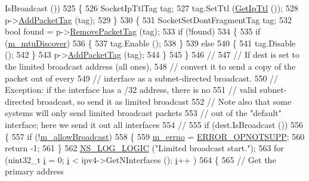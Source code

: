 \begin{DoxyCode}
      IsBroadcast ())
525     \{
526       SocketIpTtlTag tag;
527       tag.SetTtl (\hyperlink{classns3_1_1Socket_adf6420d12b8a0b6a20e46c37fe48830d}{GetIpTtl} ());
528       p->\hyperlink{classns3_1_1Packet_a7400b8655852f5271c5957250d0141af}{AddPacketTag} (tag);
529     \}
530   \{
531     SocketSetDontFragmentTag tag;
532     \textcolor{keywordtype}{bool} found = p->\hyperlink{classns3_1_1Packet_a078fe922d976a417ab25ba2f3c2fd667}{RemovePacketTag} (tag);
533     \textcolor{keywordflow}{if} (!found)
534       \{
535         \textcolor{keywordflow}{if} (\hyperlink{classns3_1_1UdpSocketImpl_ab5ae932e01b5746539b9ad20b3ff4f46}{m\_mtuDiscover})
536           \{
537             tag.Enable ();
538           \}
539         \textcolor{keywordflow}{else}
540           \{
541             tag.Disable ();
542           \}
543         p->\hyperlink{classns3_1_1Packet_a7400b8655852f5271c5957250d0141af}{AddPacketTag} (tag);
544       \}
545   \}
546   \textcolor{comment}{//}
547   \textcolor{comment}{// If dest is set to the limited broadcast address (all ones),}
548   \textcolor{comment}{// convert it to send a copy of the packet out of every }
549   \textcolor{comment}{// interface as a subnet-directed broadcast.}
550   \textcolor{comment}{// Exception:  if the interface has a /32 address, there is no}
551   \textcolor{comment}{// valid subnet-directed broadcast, so send it as limited broadcast}
552   \textcolor{comment}{// Note also that some systems will only send limited broadcast packets}
553   \textcolor{comment}{// out of the "default" interface; here we send it out all interfaces}
554   \textcolor{comment}{//}
555   \textcolor{keywordflow}{if} (dest.IsBroadcast ())
556     \{
557       \textcolor{keywordflow}{if} (!\hyperlink{classns3_1_1UdpSocketImpl_a071404252802565f1d1511b5c98b155a}{m\_allowBroadcast})
558         \{
559           \hyperlink{classns3_1_1UdpSocketImpl_ac35998e8aa2cc588e21752944b0a0095}{m\_errno} = \hyperlink{classns3_1_1Socket_ada1328c5ae0c28cb2a982caf8f6d6ccaa777b6c9712ef5485ebecfb96d5de4d54}{ERROR\_OPNOTSUPP};
560           \textcolor{keywordflow}{return} -1;
561         \}
562       \hyperlink{group__logging_ga88acd260151caf2db9c0fc84997f45ce}{NS\_LOG\_LOGIC} (\textcolor{stringliteral}{"Limited broadcast start."});
563       \textcolor{keywordflow}{for} (uint32\_t \hyperlink{bernuolliDistribution_8m_a6f6ccfcf58b31cb6412107d9d5281426}{i} = 0; \hyperlink{bernuolliDistribution_8m_a6f6ccfcf58b31cb6412107d9d5281426}{i} < ipv4->GetNInterfaces (); \hyperlink{bernuolliDistribution_8m_a6f6ccfcf58b31cb6412107d9d5281426}{i}++ )
564         \{
565           \textcolor{comment}{// Get the primary address}

\end{DoxyCode}
